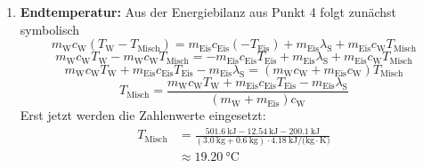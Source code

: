 \documentclass[11pt, a4paper]{article}
\begin{document}
\begin{enumerate}
    \item \textbf{Endtemperatur:}
    Aus der Energiebilanz aus Punkt 4 folgt zunächst symbolisch
    \[
        m_{\text{W}} c_{\text{W}} (T_{\text{W}} - T_{\text{Misch}})
        = m_{\text{Eis}} c_{\text{Eis}} (- T_{\text{Eis}}) + m_{\text{Eis}} \lambda_{\text{S}} + m_{\text{Eis}} c_{\text{W}} T_{\text{Misch}}
    \]
    \[
        m_{\text{W}} c_{\text{W}} T_{\text{W}} - m_{\text{W}} c_{\text{W}} T_{\text{Misch}}
        = - m_{\text{Eis}} c_{\text{Eis}} T_{\text{Eis}} + m_{\text{Eis}} \lambda_{\text{S}} + m_{\text{Eis}} c_{\text{W}} T_{\text{Misch}}
    \]
    \[
        m_{\text{W}} c_{\text{W}} T_{\text{W}} + m_{\text{Eis}} c_{\text{Eis}} T_{\text{Eis}} - m_{\text{Eis}} \lambda_{\text{S}}
        = (m_{\text{W}} c_{\text{W}} + m_{\text{Eis}} c_{\text{W}}) T_{\text{Misch}}
    \]
    \[
        T_{\text{Misch}} = \frac{m_{\text{W}} c_{\text{W}} T_{\text{W}} + m_{\text{Eis}} c_{\text{Eis}} T_{\text{Eis}} - m_{\text{Eis}} \lambda_{\text{S}}}{(m_{\text{W}} + m_{\text{Eis}}) c_{\text{W}}}
    \]
    Erst jetzt werden die Zahlenwerte eingesetzt:
    \begin{align*}
        T_{\text{Misch}} &= \frac{\SI{501.6}{\kilo\joule} - \SI{12.54}{\kilo\joule} - \SI{200.1}{\kilo\joule}}{(\SI{3.0}{\kilogram} + \SI{0.6}{\kilogram}) \cdot \SI{4.18}{\kilo\joule\per(\kilogram\cdot\kelvin)}} \\
        & \approx \SI{19.20}{\degreeCelsius}
    \end{align*}
\end{enumerate}

\newpage
\end{document}
